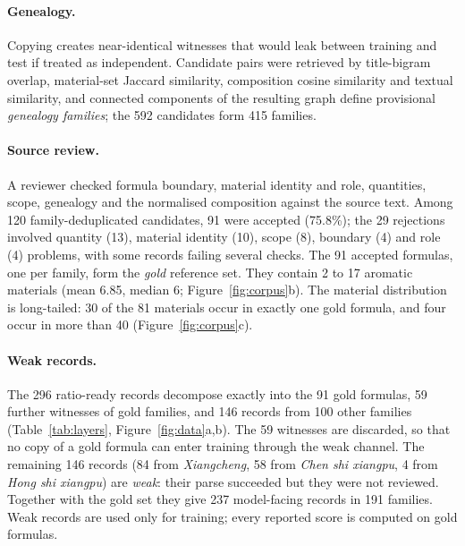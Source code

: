 \documentclass[applsci,article,submit,oneauthor]{Definitions/mdpi}
\begin{document}
\paragraph{Genealogy.} Copying creates near-identical witnesses that would leak between training and test if treated as independent. Candidate pairs were retrieved by title-bigram overlap, material-set Jaccard similarity, composition cosine similarity and textual similarity, and connected components of the resulting graph define provisional \emph{genealogy families}; the 592 candidates form 415 families.

\paragraph{Source review.} A reviewer checked formula boundary, material identity and role, quantities, scope, genealogy and the normalised composition against the source text. Among 120 family-deduplicated candidates, 91 were accepted (75.8\%); the 29 rejections involved quantity (13), material identity (10), scope (8), boundary (4) and role (4) problems, with some records failing several checks. The 91 accepted formulas, one per family, form the \emph{gold} reference set. They contain 2 to 17 aromatic materials (mean 6.85, median 6; Figure~\ref{fig:corpus}b). The material distribution is long-tailed: 30 of the 81 materials occur in exactly one gold formula, and four occur in more than 40 (Figure~\ref{fig:corpus}c).

\paragraph{Weak records.} The 296 ratio-ready records decompose exactly into the 91 gold formulas, 59 further witnesses of gold families, and 146 records from 100 other families (Table~\ref{tab:layers}, Figure~\ref{fig:data}a,b). The 59 witnesses are discarded, so that no copy of a gold formula can enter training through the weak channel. The remaining 146 records (84 from \emph{Xiangcheng}, 58 from \emph{Chen shi xiangpu}, 4 from \emph{Hong shi xiangpu}) are \emph{weak}: their parse succeeded but they were not reviewed. Together with the gold set they give 237 model-facing records in 191 families. Weak records are used only for training; every reported score is computed on gold formulas.
\end{document}
